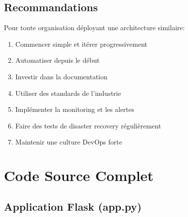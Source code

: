 \documentclass[12pt,a4paper,twoside]{report}
\begin{document}
\section{Recommandations}

Pour toute organisation déployant une architecture similaire:

\begin{enumerate}
    \item Commencer simple et itérer progressivement
    \item Automatiser depuis le début
    \item Investir dans la documentation
    \item Utiliser des standards de l'industrie
    \item Implémenter la monitoring et les alertes
    \item Faire des tests de disaster recovery régulièrement
    \item Maintenir une culture DevOps forte
\end{enumerate}

\newpage

\appendix

\chapter{Code Source Complet}

\section{Application Flask (app.py)}
\end{document}
